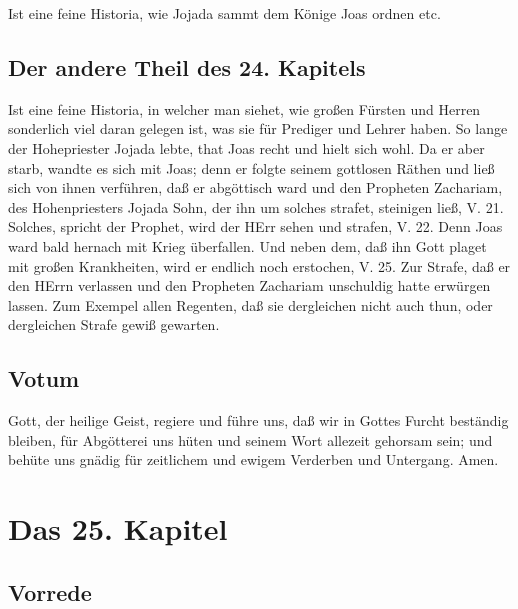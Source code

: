 Ist eine feine Historia, wie Jojada sammt dem Könige Joas ordnen etc.

\section[Der andere Theil des 24. Kapitels]{Der andere Theil des 24. Kapitels}

Ist eine feine Historia, in welcher man siehet, wie großen Fürsten und Herren sonderlich viel daran gelegen ist, was sie für Prediger und Lehrer haben. So lange der Hohepriester Jojada lebte, that Joas recht und hielt sich wohl. Da er aber starb, wandte es sich mit Joas; denn er folgte seinem gottlosen Räthen und ließ sich von ihnen verführen, daß er abgöttisch ward und den Propheten Zachariam, des Hohenpriesters Jojada Sohn, der ihn um solches strafet, steinigen ließ, V. 21. Solches, spricht der Prophet, wird der HErr sehen und strafen, V. 22. Denn Joas ward bald hernach mit Krieg überfallen. Und neben dem, daß ihn Gott plaget mit großen Krankheiten, wird er endlich noch erstochen, V. 25. Zur Strafe, daß er den HErrn verlassen und den Propheten Zachariam unschuldig hatte erwürgen lassen. Zum Exempel allen Regenten, daß sie dergleichen nicht auch thun, oder dergleichen Strafe gewiß gewarten.

\section{Votum}

Gott, der heilige Geist, regiere und führe uns, daß wir in Gottes Furcht beständig bleiben, für Abgötterei uns hüten und seinem Wort allezeit gehorsam sein; und behüte uns gnädig für zeitlichem und ewigem Verderben und Untergang. Amen.

\chapter{Das 25. Kapitel}

\section{Vorrede}

